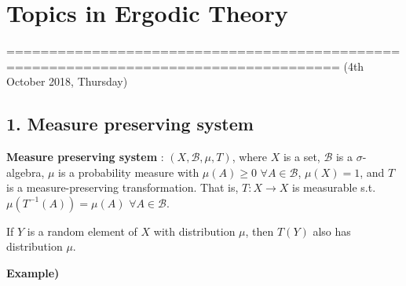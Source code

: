 \documentclass[10pt,a4paper]{report}
\begin{document}
\newcommand{\thm}{\textbf{Theorem) }}
\newcommand{\thmnum}[1]{\textbf{Theorem #1) }}
\newcommand{\defi}{\textbf{Definition) }}
\newcommand{\lem}{\textbf{Lemma) }}
\newcommand{\lemnum}[1]{\textbf{Lemma #1) }}
\newcommand{\prop}{\textbf{Proposition) }}
\newcommand{\pf}{\textbf{proof) }}
\newcommand{\cor}{\textbf{Corollary) }}
\newcommand{\cornum}[1]{\textbf{Corollary #1) }}

\newcommand{\lap}{\triangle} %
\newcommand{\s}{\vspace{10pt}}
\newcommand{\bull}{$\bullet$}
\newcommand{\sta}{$\star$}
\newcommand{\reals}{\mathbb{R}}

\newcommand{\eop}{\hfill  \textsl{(End of proof)} $\square$} %

\newcommand{\intN}{\mathbb{Z}_N}
\newcommand{\norms}[2]{\parallel #1 \parallel_{#2}}
\newcommand{\abs}[1]{\big| #1 \big|}
\newcommand{\avg}{\mathbb{E}}
\newcommand{\borel}{\mathscr{B}}
\newcommand{\setlimsup}[2]{\bigcap_{#1=1}^{\infty}\bigcup_{#2=#1}^{\infty}}

\newcommand{\newday}{======================================================================}

\setlength\parindent{0pt}
\noindent

\chapter*{Topics in Ergodic Theory}
\s

=====================================================================================
(4th October 2018, Thursday)
\s

\section*{1. Measure preserving system}

\textbf{Measure preserving system} : $(X, \borel, \mu, T)$, where $X$ is a set, $\borel$ is a $\sigma$-algebra, $\mu$ is a probability measure with $\mu(A) \geq 0$ $\forall A \in \borel$, $\mu(X)=1$, and $T$ is a measure-preserving transformation. That is, $T: X\rightarrow X$ is measurable s.t. $\mu(T^{-1}(A)) = \mu(A)$ $\forall A \in \borel$.
\s

If $Y$ is a random element of $X$ with distribution $\mu$, then $T(Y)$ also has distribution $\mu$.
\s

\textbf{Example)}
\end{document}
